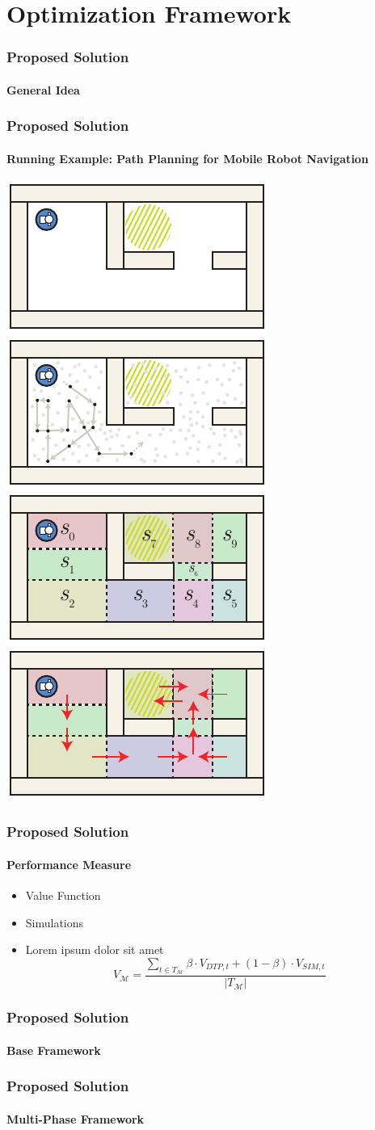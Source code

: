 \section{Optimization Framework}

\begin{frame}
\frametitle{Proposed Solution}
\framesubtitle{General Idea}


\end{frame}

\begin{frame}
\frametitle{Proposed Solution}
\framesubtitle{Running Example: Path Planning for Mobile Robot Navigation}

\centering
\includegraphics[width=.3\textwidth]{figures/dummy-map-2-1}
\qquad
\includegraphics[width=.3\textwidth]{figures/dummy-map-2-2v2}\\\vspace{8pt}
\includegraphics[width=.3\textwidth]{figures/dummy-map-2-3} \qquad \includegraphics[width=.3\textwidth]{figures/dummy-map-2-4}


\end{frame}

\begin{frame}
\frametitle{Proposed Solution}
\framesubtitle{Performance Measure}
\begin{itemize}
	\item Value Function
	\item Simulations
	
	\item Lorem ipsum dolor sit amet
$$V_{\mathcal{M}} = \frac{\sum_{t \in T_\mathcal{M}} \beta \cdot V_{\mathit{DTP}, t} + (1 - \beta) \cdot V_{\mathit{SIM}, t}}{|T_\mathcal{M}|}$$
\end{itemize}

\end{frame}

\begin{frame}
\frametitle{Proposed Solution}
\framesubtitle{Base Framework}


\end{frame}

\begin{frame}
\frametitle{Proposed Solution}
\framesubtitle{Multi-Phase Framework}


\end{frame}